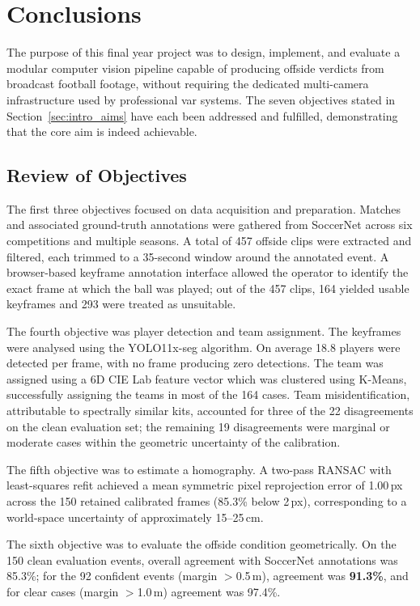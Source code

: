 \chapter{Conclusions}%
\label{chp:conclusions}

The purpose of this final year project was to design, implement, and evaluate a modular computer vision pipeline capable of producing offside verdicts from broadcast football footage, without requiring the dedicated multi-camera infrastructure used by professional \gls{var} systems. The seven objectives stated in Section~\ref{sec:intro_aims} have each been addressed and fulfilled, demonstrating that the core aim is indeed achievable.

\section{Review of Objectives}%
\label{sec:conc_objectives}

The first three objectives focused on data acquisition and preparation. Matches and associated ground-truth annotations were gathered from SoccerNet across six competitions and multiple seasons. A total of 457 offside clips were extracted and filtered, each trimmed to a 35-second window around the annotated event. A browser-based keyframe annotation interface allowed the operator to identify the exact frame at which the ball was played; out of the 457 clips, 164 yielded usable keyframes and 293 were treated as unsuitable.

The fourth objective was player detection and team assignment. The keyframes were analysed using the YOLO11x-seg algorithm. On average 18.8 players were detected per frame, with no frame producing zero detections. The team was assigned using a 6D CIE Lab feature vector which was clustered using K-Means, successfully assigning the teams in most of the 164 cases. Team misidentification, attributable to spectrally similar kits, accounted for three of the 22 disagreements on the clean evaluation set; the remaining 19 disagreements were marginal or moderate cases within the geometric uncertainty of the calibration.

The fifth objective was to estimate a homography. A two-pass RANSAC with least-squares refit achieved a mean symmetric pixel reprojection error of 1.00\,px across the 150 retained calibrated frames (85.3\% below 2\,px), corresponding to a world-space uncertainty of approximately 15--25\,cm.

The sixth objective was to evaluate the offside condition geometrically. On the 150 clean evaluation events, overall agreement with SoccerNet annotations was 85.3\%; for the 92 confident events (margin $>$0.5\,m), agreement was \textbf{91.3\%}, and for clear cases (margin $>$1.0\,m) agreement was 97.4\%.

